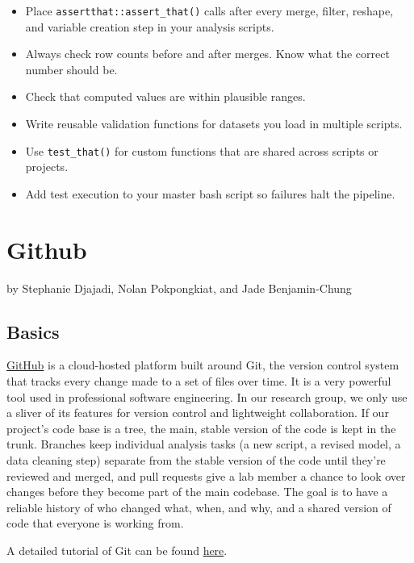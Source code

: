\documentclass[
]{book}
\providecommand{\tightlist}{%
  \setlength{\itemsep}{0pt}\setlength{\parskip}{0pt}}
\begin{document}
\begin{itemize}
\tightlist
\item
  Place \texttt{assertthat::assert\_that()} calls after every merge, filter, reshape, and variable creation step in your analysis scripts.
\item
  Always check row counts before and after merges. Know what the correct number should be.
\item
  Check that computed values are within plausible ranges.
\item
  Write reusable validation functions for datasets you load in multiple scripts.
\item
  Use \texttt{test\_that()} for custom functions that are shared across scripts or projects.
\item
  Add test execution to your master bash script so failures halt the pipeline.
\end{itemize}

\chapter{Github}\label{github}

by Stephanie Djajadi, Nolan Pokpongkiat, and Jade Benjamin-Chung

\section{Basics}\label{basics}

\href{https://github.com/}{GitHub} is a cloud-hosted platform built around Git, the version control system that tracks every change made to a set of files over time. It is a very powerful tool used in professional software engineering. In our research group, we only use a sliver of its features for version control and lightweight collaboration. If our project's code base is a tree, the main, stable version of the code is kept in the trunk. Branches keep individual analysis tasks (a new script, a revised model, a data cleaning step) separate from the stable version of the code until they're reviewed and merged, and pull requests give a lab member a chance to look over changes before they become part of the main codebase. The goal is to have a reliable history of who changed what, when, and why, and a shared version of code that everyone is working from.

A detailed tutorial of Git can be found \href{https://docs.github.com/en/get-started/start-your-journey/hello-world}{here}.
\end{document}
